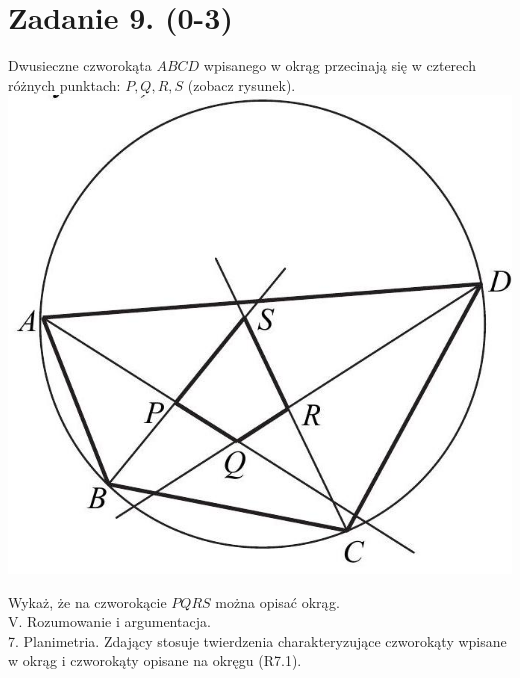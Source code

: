 \documentclass[10pt]{article}
\begin{document}
\section*{Zadanie 9. (0-3)}
Dwusieczne czworokąta $A B C D$ wpisanego w okrąg przecinają się w czterech różnych punktach: $P, Q, R, S$ (zobacz rysunek).\\
\includegraphics[max width=\textwidth, center]{2025_02_07_f5f4e8f37e6baab02e47g-07}

Wykaż, że na czworokącie $P Q R S$ można opisać okrąg.\\
V. Rozumowanie i argumentacja.\\
7. Planimetria. Zdający stosuje twierdzenia charakteryzujące czworokąty wpisane w okrąg i czworokąty opisane na okręgu (R7.1).
\end{document}
